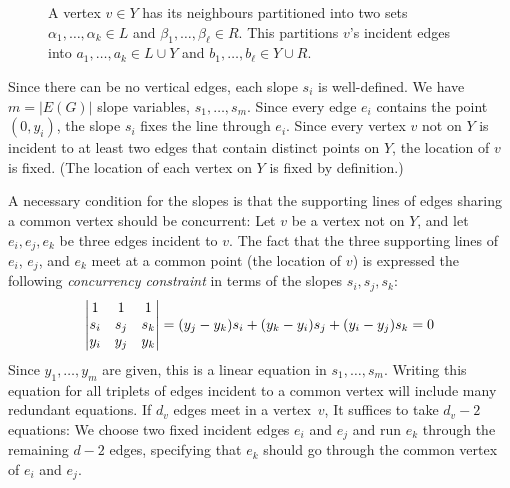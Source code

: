 \documentclass{patmorin}
\begin{document}
\begin{figure}
     \caption{A vertex $v\in Y$ has its neighbours partitioned into two sets $\alpha_1,\ldots,\alpha_k\in L$ and $\beta_1,\ldots,\beta_\ell\in R$. This partitions $v$'s incident edges into $a_1,\ldots,a_k\in L\cup Y$ and $b_1,\ldots,b_\ell\in Y\cup R$.}
\end{figure}


Since there can be no vertical edges, each slope $s_i$ is well-defined.
We have $m=|E(G)|$ slope variables, $s_1,\ldots,s_m$.  Since every edge
$e_i$ contains the point $(0,y_i)$, the slope $s_i$
fixes the line through $e_i$.  Since every vertex $v$ not on $Y$ is
incident to at least two edges that contain distinct points on $Y$,
the location of $v$ is fixed.  (The location of each vertex on $Y$
is fixed by definition.)

A necessary condition for the slopes is that the supporting lines of edges 
sharing 
a common vertex should be concurrent: Let $v$ be a vertex 
not on $Y$, and let $e_i, e_j, e_k$ be three edges incident to $v$.
The fact that the three supporting lines of $e_i$, $e_j$, and $e_k$
meet at a common point (the location of $v$) is expressed the following
\emph{concurrency constraint} in terms of the slopes $s_i,s_j,s_k$:
\begin{equation}\eqlabel{slope0} 
\left|
  \begin{matrix}
    1&1&1\\
s_i&s_j&s_k\\
y_i&y_j&y_k
  \end{matrix}
\right|=
   ({y_j-y_k}) s_i + ({y_k-y_i}) s_j 
          + ({y_i-y_j})s_k  = 0
\end{equation}
Since $y_1,\ldots,y_m$ are given, this is a linear equation
in $s_1,\ldots,s_m$.
Writing this equation for all triplets of edges incident to a common
vertex will include many redundant equations.
If $d_v$ edges meet in a vertex~$v$, 
 It suffices to take $d_v-2$ equations: We choose two fixed
incident edges $e_i$ and $e_j$ and run $e_k$ through the remaining
$d-2$ edges, specifying that $e_k$ should go through the common vertex
of $e_i$ and $e_j$.
\end{document}
